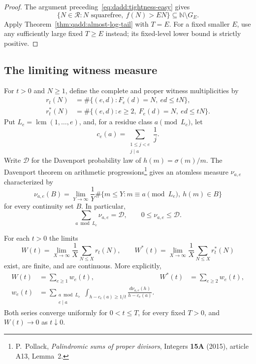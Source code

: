 \begin{proof}
The argument preceding~\eqref{eq:dadd:tightness-easy} gives
\[
 \{N\in\mathcal R:N\text{ squarefree},\ f(N)>EN\}
 \subseteq\mathbb N\setminus G_E.
\]
Apply Theorem~\ref{thm:qadd:almost-log-tail} with $T=E$.
For a fixed smaller $E$, use any sufficiently large fixed $T\geq E$
instead; its fixed-level lower bound is strictly positive.
\end{proof}

\subsection{The limiting witness measure}

For $t>0$ and $N\geq1$, define the complete and proper witness
multiplicities by
\begin{align*}
 r_t(N)
 &=\#\{(e,d):F_e(d)=N,\ ed\leq tN\},\\
 r_t^*(N)
 &=\#\{(e,d):e\geq2,\ F_e(d)=N,\ ed\leq tN\}.
\end{align*}
Put $L_e=\operatorname{lcm}(1,\ldots,e)$, and, for a residue class
$a\pmod{L_e}$, let
\[
 c_e(a)=\sum_{\substack{1\leq j<e\\j\mid a}}\frac1j.
\]
Write $\mathcal D$ for the Davenport probability law of
$h(m)=\sigma(m)/m$. The Davenport theorem on arithmetic
progressions\footnote{P.~Pollack, \emph{Palindromic sums of proper
divisors}, Integers \textbf{15A} (2015), article A13, Lemma~2.}
gives an atomless measure $\nu_{a,e}$ characterized by
\[
 \nu_{a,e}(B)
 =\lim_{Y\to\infty}\frac1Y
    \#\{m\leq Y:m\equiv a\pmod{L_e},\ h(m)\in B\}
\]
for every continuity set $B$. In particular,
\begin{equation}
\label{eq:dadd:progression-domination}
 \sum_{a\bmod L_e}\nu_{a,e}=\mathcal D,
 \qquad 0\leq\nu_{a,e}\leq\mathcal D.
\end{equation}

\begin{proposition}
\label{prop:dadd:witness-means}
For each $t>0$ the limits
\[
 W(t)=\lim_{X\to\infty}\frac1X\sum_{N\leq X}r_t(N),
 \qquad
 W^*(t)=\lim_{X\to\infty}\frac1X\sum_{N\leq X}r_t^*(N)
\]
exist, are finite, and are continuous. More explicitly,
\begin{align}
 W(t)&=\sum_{e\geq1}w_e(t),
 &W^*(t)&=\sum_{e\geq2}w_e(t),
 \label{eq:dadd:witness-sums}\\
 w_e(t)
 &=\sum_{\substack{a\bmod L_e\\e\mid a}}
      \int_{h-c_e(a)\geq1/t}
       \frac{d\nu_{a,e}(h)}{h-c_e(a)}.
 \label{eq:dadd:witness-integral}
\end{align}
Both series converge uniformly for $0<t\leq T$, for every fixed
$T>0$, and $W(t)\to0$ as $t\downarrow0$.
\end{proposition}

